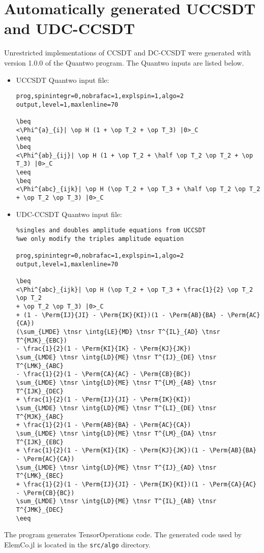\documentclass[a4paper,12pt,oneside]{book}
\newcommand{\veryshortarrow}[1][3pt]{\mathrel{%
   \hbox{\rule[\dimexpr\fontdimen22\textfont2-.2pt\relax]{#1}{.4pt}}%
   \mkern-4mu\hbox{\usefont{U}{lasy}{m}{n}\symbol{41}}}}
\newcommand{\op}{\hat}
\newcommand{\Perm}[2]{{\cal P}\left({#1}\veryshortarrow {#2}\right)}
\newcommand{\half}{\frac{1}{2}}
\newcommand{\ElemCojl}{\textsf{ElemCo.jl} }
\newcommand{\quantwo}{\textsf{Quantwo} }
\begin{document}
\chapter{Automatically generated UCCSDT and UDC-CCSDT}
Unrestricted implementations of CCSDT and DC-CCSDT\cite{kats19_dc,rishi19,schraivogel21_dc} were generated with version 1.0.0 of the \quantwo program\cite{quantwo}.
The \quantwo inputs are listed below.
\begin{itemize}
  \item UCCSDT \quantwo input file:
\begin{lstlisting}
prog,spinintegr=0,nobrafac=1,explspin=1,algo=2
output,level=1,maxlenline=70

\beq
<\Phi^{a}_{i}| \op H (1 + \op T_2 + \op T_3) |0>_C
\eeq
\beq
<\Phi^{ab}_{ij}| \op H (1 + \op T_2 + \half \op T_2 \op T_2 + \op T_3) |0>_C
\eeq
\beq
<\Phi^{abc}_{ijk}| \op H (\op T_2 + \op T_3 + \half \op T_2 \op T_2 + \op T_2 \op T_3) |0>_C
\end{lstlisting}
\item UDC-CCSDT \quantwo input file:
\begin{lstlisting}
%singles and doubles amplitude equations from UCCSDT
%we only modify the triples amplitude equation

prog,spinintegr=0,nobrafac=1,explspin=1,algo=2
output,level=1,maxlenline=70

\beq
<\Phi^{abc}_{ijk}| \op H (\op T_2 + \op T_3 + \frac{1}{2} \op T_2 \op T_2 
+ \op T_2 \op T_3) |0>_C 
+ (1 - \Perm{IJ}{JI} - \Perm{IK}{KI})(1 - \Perm{AB}{BA} - \Perm{AC}{CA})
(\sum_{LMDE} \tnsr \intg{LE}{MD} \tnsr T^{IL}_{AD} \tnsr T^{MJK}_{EBC}) 
- \frac{1}{2}(1 - \Perm{KI}{IK} - \Perm{KJ}{JK}) 
\sum_{LMDE} \tnsr \intg{LD}{ME} \tnsr T^{IJ}_{DE} \tnsr T^{LMK}_{ABC} 
- \frac{1}{2}(1 - \Perm{CA}{AC} - \Perm{CB}{BC}) 
\sum_{LMDE} \tnsr \intg{LD}{ME} \tnsr T^{LM}_{AB} \tnsr T^{IJK}_{DEC} 
+ \frac{1}{2}(1 - \Perm{IJ}{JI} - \Perm{IK}{KI}) 
\sum_{LMDE} \tnsr \intg{LD}{ME} \tnsr T^{LI}_{DE} \tnsr T^{MJK}_{ABC} 
+ \frac{1}{2}(1 - \Perm{AB}{BA} - \Perm{AC}{CA}) 
\sum_{LMDE} \tnsr \intg{LD}{ME} \tnsr T^{LM}_{DA} \tnsr T^{IJK}_{EBC} 
+ \frac{1}{2}(1 - \Perm{KI}{IK} - \Perm{KJ}{JK})(1 - \Perm{AB}{BA} - \Perm{AC}{CA}) 
\sum_{LMDE} \tnsr \intg{LD}{ME} \tnsr T^{IJ}_{AD} \tnsr T^{LMK}_{BEC} 
+ \frac{1}{2}(1 - \Perm{IJ}{JI} - \Perm{IK}{KI})(1 - \Perm{CA}{AC} - \Perm{CB}{BC}) 
\sum_{LMDE} \tnsr \intg{LD}{ME} \tnsr T^{IL}_{AB} \tnsr T^{JMK}_{DEC}
\eeq
\end{lstlisting}
\end{itemize}
\noindent The program generates \textsf{TensorOperations} code.
The generated code  used by \ElemCojl is located in the \texttt{src/algo} directory. 


\end{document}
